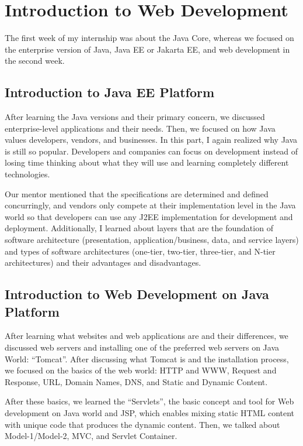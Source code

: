 \section{Introduction to Web Development}

The first week of my internship was about the Java Core, whereas we focused on the enterprise version of Java, Java EE or Jakarta EE, and web development in the second week.

\subsection{Introduction to Java EE Platform}

After learning the Java versions and their primary concern, we discussed enterprise-level applications and their needs. Then, we focused on how Java values developers, vendors, and businesses. In this part, I again realized why Java is still so popular. Developers and companies can focus on development instead of losing time thinking about what they will use and learning completely different technologies.

Our mentor mentioned that the specifications are determined and defined concurringly, and vendors only compete at their implementation level in the Java world so that developers can use any J2EE implementation for development and deployment. Additionally, I learned about layers that are the foundation of software architecture (presentation, application/business, data, and service layers) and types of software architectures (one-tier, two-tier, three-tier, and N-tier architectures) and their advantages and disadvantages.

\subsection{Introduction to Web Development on Java Platform}

After learning what websites and web applications are and their differences, we discussed web servers and installing one of the preferred web servers on Java World: ``Tomcat''. After discussing what Tomcat is and the installation process, we focused on the basics of the web world: HTTP and WWW, Request and Response, URL, Domain Names, DNS, and Static and Dynamic Content.

After these basics, we learned the ``Servlets'', the basic concept and tool for Web development on Java world and JSP, which enables mixing static HTML content with unique code that produces the dynamic content. Then, we talked about Model-1/Model-2, MVC, and Servlet Container.

